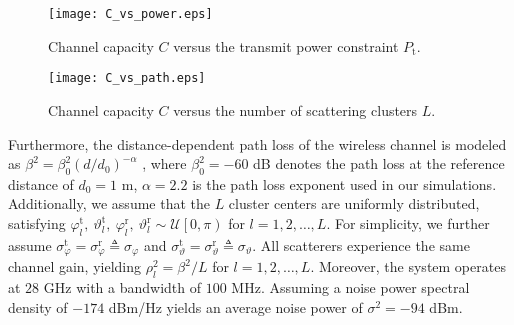 \documentclass[lettersize,journal]{IEEEtran}
\begin{document}
\begin{figure}[!t]
\centering
\texttt{[image: C\_vs\_power.eps]}
\caption{Channel capacity $C$ versus the transmit power constraint $P_\textrm{t}$.}
\label{fig_6}
\end{figure}
\begin{figure}[!t]
\centering
\texttt{[image: C\_vs\_path.eps]}
\caption{Channel capacity $C$ versus the number of scattering clusters $L$.}\vspace{-0.5cm}
\label{fig_7}
\end{figure}
Furthermore, the distance-dependent path loss of the wireless channel is modeled as $\beta ^{2}=\beta _{0}^{2}\left ( d/d_{0} \right )^{-\alpha}$ \cite{TCOM_2015_Rappaport_Wideband}, where $\beta _{0}^2 = -60$ dB denotes the path loss at the reference distance of $d_0 = 1$ m, $\alpha = 2.2$ is the path loss exponent used in our simulations. Additionally, we assume that the $L$ cluster centers are uniformly distributed, satisfying $\varphi _{l}^{\textrm{t}},\ \vartheta_{l}^{\textrm{t}},\ \varphi _{l}^{\textrm{r}},\ \vartheta _{l}^{\textrm{r}}\sim \mathcal{U}\left [ 0,\pi \right )$ for $l=1,2,\ldots,L$. For simplicity, we further assume $\sigma_{\varphi}^{\textrm{t}} = \sigma_{\varphi}^{\textrm{r}} \triangleq \sigma_{\varphi}$ and $\sigma_{\vartheta}^{\textrm{t}} = \sigma_{\vartheta}^{\textrm{r}} \triangleq \sigma_{\vartheta}$. All scatterers experience the same channel gain, yielding $\rho _{l}^{2}=\beta^{2}/L$ for $l=1,2,\ldots,L$. Moreover, the system operates at $28$ GHz with a bandwidth of $100$ MHz. Assuming a noise power spectral density of $-174$ dBm/Hz yields an average noise power of $\sigma^2 = -94$ dBm.
\end{document}
